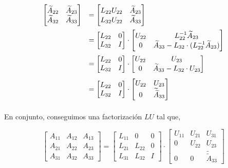 \documentclass[a4paper,12pt]{article}
\begin{document}
\begin{equation}
\begin{array}{l l}
	\begin{bmatrix}
		\widetilde{A}_{22} & \widetilde{A}_{23} \\
		\widetilde{A}_{32} & \widetilde{A}_{33}
	\end{bmatrix}
	& =
	\begin{bmatrix}
		L_{22} U_{22} & \widetilde{A}_{23} \\
		L_{32} U_{22} & \widetilde{A}_{33}
	\end{bmatrix}\\[.5cm]
	\, & = 
	\begin{bmatrix}
		L_{22} & 0 \\
		L_{32} & I
	\end{bmatrix}
	\cdot
	\begin{bmatrix}
		U_{22} & L_{22}^{-1} \widetilde{A}_{23} \\
		0 & \widetilde{A}_{33} - L_{32}\cdot (L_{22}^{-1} \widetilde{A}_{23})
	\end{bmatrix}\\[.5cm]
	\, & = 
	\begin{bmatrix}
		L_{22} & 0 \\
		L_{32} & I
	\end{bmatrix}
	\cdot
	\begin{bmatrix}
		U_{22} & U_{23} \\
		0 & \widetilde{A}_{33} - L_{32}\cdot U_{23}
	\end{bmatrix}\\[.5cm]
	\, & = 
	\begin{bmatrix}
		L_{22} & 0 \\
		L_{32} & I
	\end{bmatrix}
	\cdot
		\begin{bmatrix}
		U_{22} & U_{23} \\
		0 & \widetilde{\widetilde{A}}_{33}
	\end{bmatrix}\\[.5cm]
\end{array}
\end{equation}

En conjunto, conseguimos una factorizaci\'on $LU$ tal que,

\begin{equation}
	\begin{bmatrix}
		A_{11} & A_{12} & A_{13} \\
		A_{21} & A_{22} & A_{23} \\
		A_{31} & A_{32} & A_{33} 
	\end{bmatrix}
	=
	\begin{bmatrix}
		L_{11} & 0 & 0 \\
		L_{21} & L_{22} & 0 \\
		L_{31} & L_{32} & I 
	\end{bmatrix}
	\cdot
	\begin{bmatrix}
		U_{11} & U_{21} & U_{31} \\
		0 & U_{22} & U_{23} \\
		0 & 0 & \widetilde{\widetilde{A}}_{33} 
	\end{bmatrix}
\end{equation}
\end{document}
